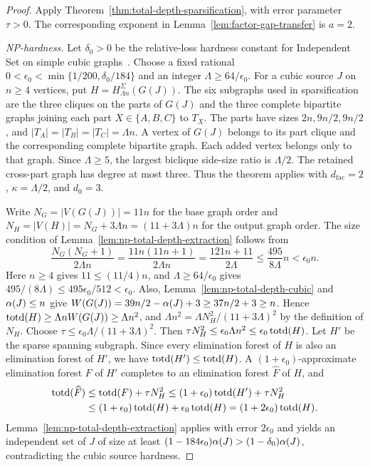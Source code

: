 \begin{proof}
Apply Theorem~\ref{thm:total-depth-sparsification}, with error
parameter $\tau>0$.
The corresponding exponent in Lemma~\ref{lem:factor-gap-transfer}
is $a=2$.

\emph{\textup{NP}-hardness.}
Let $\delta_0>0$ be the relative-loss hardness constant for
Independent Set on simple cubic graphs~\cite{AlimontiKann2000}.
Choose a fixed rational
$0<\epsilon_0<\min\{1/200,\delta_0/184\}$ and an integer
$\Lambda\ge64/\epsilon_0$. For a cubic source $J$ on $n\ge4$ vertices,
put $H=H^{\Sigma}_{\Lambda n}(G(J))$. The six subgraphs used in sparsification
are the three cliques on the parts of $G(J)$ and the three complete
bipartite graphs joining each part $X\in\{A,B,C\}$ to $T_X$. The
parts have sizes $2n,9n/2,9n/2$, and
$|T_A|=|T_B|=|T_C|=\Lambda n$. A vertex
of $G(J)$ belongs to its part clique and the corresponding complete
bipartite graph. Each added vertex belongs only to that graph. Since
$\Lambda\ge5$,
the largest biclique side-size ratio is $\Lambda/2$. The retained
cross-part graph has degree at most three. Thus the theorem applies
with $d_{\mathrm{fac}}=2$, $\kappa=\Lambda/2$, and $d_0=3$.

Write $N_G=|V(G(J))|=11n$ for the base graph order and
$N_H=|V(H)|=N_G+3\Lambda n=(11+3\Lambda)n$ for the output graph order. The size condition of
Lemma~\ref{lem:np-total-depth-extraction} follows from
\[
 \frac{N_G(N_G+1)}{2\Lambda n}=\frac{11n(11n+1)}{2\Lambda n}
 =\frac{121n+11}{2\Lambda}
 \leq\frac{495}{8\Lambda}n<\epsilon_0n.
\]
Here $n\ge4$ gives $11\le(11/4)n$, and
$\Lambda\ge64/\epsilon_0$ gives
$495/(8\Lambda)\le495\epsilon_0/512<\epsilon_0$.
Also, Lemma~\ref{lem:np-total-depth-cubic} and $\alpha(J)\le n$ give
$W(G(J))=39n/2-\alpha(J)+3\ge37n/2+3\ge n$. Hence
$\operatorname{totd}(H)\ge\Lambda nW(G(J))\ge\Lambda n^2$, and
$\Lambda n^2=\Lambda N_H^2/(11+3\Lambda)^2$ by the definition of $N_H$.
Choose $\tau\le\epsilon_0\Lambda/(11+3\Lambda)^2$. Then
$\tau N_H^2\le\epsilon_0\Lambda n^2\le\epsilon_0\operatorname{totd}(H)$.
Let $H'$ be the sparse spanning subgraph. Since every elimination
forest of $H$ is also an elimination forest of $H'$, we have
$\operatorname{totd}(H')\le\operatorname{totd}(H)$. A $(1+\epsilon_0)$-approximate elimination
forest $F$ of $H'$ completes to an elimination forest $\widehat F$ of $H$, and
\[
\begin{aligned}
 \operatorname{totd}(\widehat F)
 &\leq\operatorname{totd}(F)+\tau N_H^2
 \leq(1+\epsilon_0)\operatorname{totd}(H')+\tau N_H^2\\
 &\leq(1+\epsilon_0)\operatorname{totd}(H)+\epsilon_0\operatorname{totd}(H)
 =(1+2\epsilon_0)\operatorname{totd}(H).
\end{aligned}
\]
Lemma~\ref{lem:np-total-depth-extraction} applies with error
$2\epsilon_0$ and yields an independent set of $J$ of size
at least $(1-184\epsilon_0)\alpha(J)>(1-\delta_0)\alpha(J)$,
contradicting the cubic source hardness.


\end{proof}
